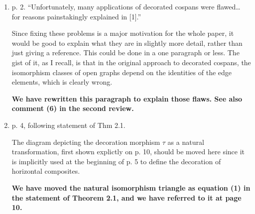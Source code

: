 \documentclass[reqno]{amsart}
\def\chris{\color{purple} Christina: }
\def\john{\color{red} John: }
\def\kenny{\color{blue} Kenny: }
\begin{document}
\begin{enumerate}

\item p. 2. ``Unfortunately, many applications of decorated cospans were flawed… for reasons painstakingly explained in [1].''

Since fixing these problems is a major motivation for the whole paper, it would be good to explain what they are in slightly more detail, rather than 
just giving a reference. This could be done in a one paragraph or less. The gist of it, as I recall, is that in the original approach to decorated 
cospans, the isomorphism classes of open graphs depend on the identities of the edge elements, which is clearly wrong.

{\bf We have rewritten this paragraph to explain those flaws.  See also comment (6) in the second review.}

  

\iffalse
{\chris If I am not wrong, the paragraph cited here IS the explanation of the problem, perhaps in application terms rather than in theory terms. 
Consider perhaps adding one sentence along the lines suggested?}

{\kenny This seems similar to comment 14 above. So that's two people that want to know more about what the flaws are with the original decorated cospans but don't feel like opening our other paper...}

{\john You're right, Christina, I already explained why ``many applications of decorated cospans were flawed'' in this paragraph!   See if you like my boldface response.  I sneakily pretend that we rewrote this paragraph to explain the flaws.  We actually have rewritten this paragraph... but the explanation was already there!

And yeah, Kenny, it's annoying: people complain if you repeat already known stuff, but they also complain if you don't.}

\fi

\item p. 4, following statement of Thm 2.1.

The diagram depicting the decoration morphism $\tau$ as a natural transformation, first shown explictly on p. 10, should be moved here since it is 
implicitly used at the beginning of p. 5 to define the decoration of horizontal composites.

{\bf We have moved the natural isomorphism triangle as equation (1) in the statement of Theorem 2.1, and we have referred to it at page 10.} 


\end{enumerate}
\end{document}
